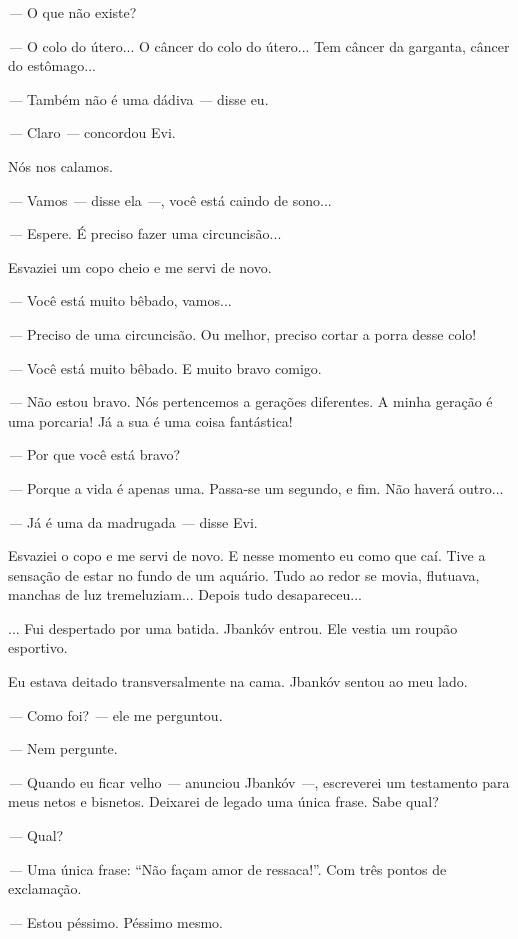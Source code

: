 \emph{---} O que não existe?

\emph{---} O colo do útero... O câncer do colo do útero... Tem câncer da
garganta, câncer do estômago...

\emph{---} Também não é uma dádiva \emph{---} disse eu.

\emph{---} Claro \emph{---} concordou Evi.

Nós nos calamos.

\emph{---} Vamos \emph{---} disse ela \emph{---}, você está caindo de
sono...

\emph{---} Espere. É preciso fazer uma circuncisão...

Esvaziei um copo cheio e me servi de novo.

\emph{---} Você está muito bêbado, vamos...

\emph{---} Preciso de uma circuncisão. Ou melhor, preciso cortar a porra
desse colo!

\emph{---} Você está muito bêbado. E muito bravo comigo.

\emph{---} Não estou bravo. Nós pertencemos a gerações diferentes. A
minha geração é uma porcaria! Já a sua é uma coisa fantástica!

\emph{---} Por que você está bravo?

\emph{---} Porque a vida é apenas uma. Passa-se um segundo, e fim. Não
haverá outro...

\emph{---} Já é uma da madrugada \emph{---} disse Evi.

Esvaziei o copo e me servi de novo. E nesse momento eu como que caí.
Tive a sensação de estar no fundo de um aquário. Tudo ao redor se movia,
flutuava, manchas de luz tremeluziam... Depois tudo desapareceu...

... Fui despertado por uma batida. Jbankóv entrou. Ele vestia um roupão
esportivo.

Eu estava deitado transversalmente na cama. Jbankóv sentou ao meu lado.

\emph{---} Como foi? \emph{---} ele me perguntou.

\emph{---} Nem pergunte.

\emph{---} Quando eu ficar velho \emph{---} anunciou Jbankóv \emph{---},
escreverei um testamento para meus netos e bisnetos. Deixarei de legado
uma única frase. Sabe qual?

\emph{---} Qual?

\emph{---} Uma única frase: ``Não façam amor de ressaca!''. Com três
pontos de exclamação.

\emph{---} Estou péssimo. Péssimo mesmo.

